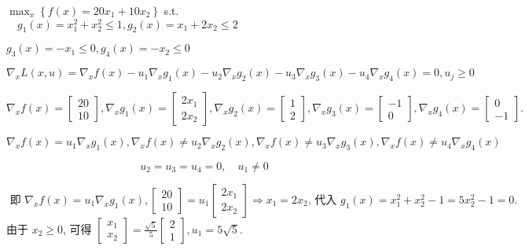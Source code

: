 \begin{example}

    \begin{problem}
    $ \max _{x}\left\{f(x)=20 x_{1}+10 x_{2}\right\} $
s.t. $ \quad g_{1}(x)=x_{1}^{2}+x_{2}^{2} \leq 1, g_{2}(x)=x_{1}+2 x_{2} \leq 2 $

\end{problem}
$ g_{3}(x)=-x_{1} \leq 0, g_{4}(x)=-x_{2} \leq 0 $

$ \nabla_{x} L(x, u)=\nabla_{x} f(x)-u_{1} \nabla_{x} g_{1}(x)-u_{2} \nabla_{x} g_{2}(x)-u_{3} \nabla_{x} g_{3}(x)-u_{4} \nabla_{x} g_{4}(x)=0, u_{j} \geq 0 $

$ \nabla_{x} f(x)=\left[\begin{array}{c}20 \\ 10\end{array}\right], \nabla_{x} g_{1}(x)=\left[\begin{array}{c}2 x_{1} \\ 2 x_{2}\end{array}\right], \nabla_{x} g_{2}(x)=\left[\begin{array}{l}1 \\ 2\end{array}\right], \nabla_{x} g_{3}(x)=\left[\begin{array}{l}-1 \\ 0\end{array}\right], \nabla_{x} g_{4}(x)=\left[\begin{array}{l}0 \\ -1\end{array}\right] . $

$$ \nabla_{x} f(x)=u_{1} \nabla_{x} g_{1}(x), \nabla_{x} f(x) \neq u_{2} \nabla_{x} g_{2}(x), \nabla_{x} f(x) \neq u_{3} \nabla_{x} g_{3}(x), \nabla_{x} f(x) \neq u_{4} \nabla_{x} g_{4}(x) $$

$$ u_{2}=u_{3}=u_{4}=0, \quad u_{1} \neq 0 $$

$$
\text { 即 } \nabla_{x} f(x)=u_{1} \nabla_{x} g_{1}(x),\left[\begin{array}{c}
20 \\
10
\end{array}\right]=u_{1}\left[\begin{array}{c}
2 x_{1} \\
2 x_{2}
\end{array}\right] \Rightarrow x_{1}=2 x_{2} \text {, 代入 } g_{1}(x)=x_{1}^{2}+x_{2}^{2}-1=5 x_{2}^{2}-1=0 \text {. }
$$
由于 $ x_{2} \geq 0 $, 可得 $ \left[\begin{array}{l}x_{1} \\ x_{2}\end{array}\right]=\frac{\sqrt{5}}{5}\left[\begin{array}{l}2 \\ 1\end{array}\right], u_{1}=5 \sqrt{5} $.

\end{example}

